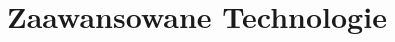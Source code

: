 \documentclass[11pt,a4paper]{article}
\begin{document}
% 
% 


\section{Zaawansowane Technologie}
\end{document}
